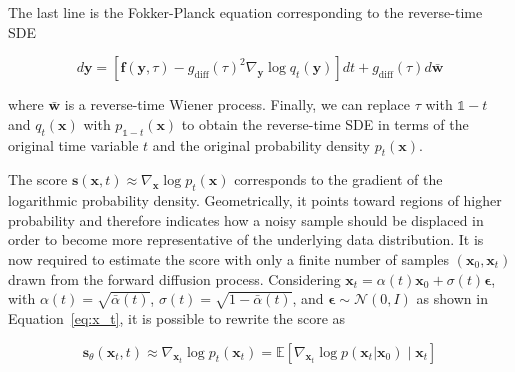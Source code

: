\begin{compactproof}[title={Proof}]
The last line is the Fokker-Planck equation corresponding to the reverse-time SDE

\begin{equation*}
\boxed{
d\mathbf{y}
=
\left[
\mathbf{f}(\mathbf{y},\tau)
-
g_{\mathrm{diff}}(\tau)^2
\nabla_{\mathbf{y}}
\log q_t(\mathbf{y})
\right]dt
+
g_{\mathrm{diff}}(\tau)d\bar{\mathbf{w}}
}
\end{equation*}

where $\bar{\mathbf{w}}$ is a reverse-time Wiener process. Finally, we can replace $\tau$ with $\mathds{1}-t$ and $q_t(\mathbf{x})$ with $p_{\mathds{1}-t}(\mathbf{x})$ to obtain the reverse-time SDE in terms of the original time variable $t$ and the original probability density $p_t(\mathbf{x})$.     

\end{compactproof}

The score $\mathbf{s}(\mathbf{x},t) \approx \nabla_{\mathbf{x}}\log p_t(\mathbf{x})$ corresponds to the gradient of the logarithmic probability density. Geometrically, it points toward regions of higher probability and therefore indicates how a noisy sample should be displaced in order to become more representative of the underlying data distribution. It is now required to estimate the score with only a finite number of samples $(\mathbf{x}_{0},\mathbf{x}_{t})$ drawn from the forward diffusion process. Considering $\mathbf{x}_{t} = \alpha(t)\mathbf{x}_{0} + \sigma(t)\boldsymbol{\epsilon}$, with $\alpha(t)=\sqrt{\bar{\alpha}(t)}$, $\sigma(t)=\sqrt{1-\bar{\alpha}(t)}$, and $\boldsymbol{\epsilon} \sim \mathcal{N}(0, I)$ as shown in Equation~\ref{eq:x_t}, it is possible to rewrite the score as

\begin{equation}
    \mathbf{s}_{\theta}(\mathbf{x}_t,t)
    \approx
    \nabla_{\mathbf{x}_t}\log p_t(\mathbf{x}_t)
    =
    \mathbb{E}[
        \nabla_{\mathbf{x}_t}\log p(\mathbf{x}_t|\mathbf{x}_0)
        \mid
        \mathbf{x}_t
    ]
\end{equation}

